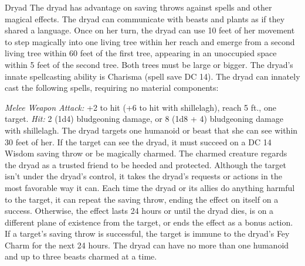 \documentclass[10pt,a4paper,twoside,twocolumn,openany,bg=print,nodeprecatedcode]{dndbook}
\begin{document}
\begin{DndMonster}[float*=t]{Dryad}
\DndMonsterBasics[
armor-class = {11 (16 with barkskin)},
hit-points = {\DndDice{5d8}},
speed = {30 ft.}
]
\DndMonsterAbilityScores[
 str = 10,
 dex = 12,
 con = 11,
 int = 14,
 wis = 15,
 cha = 18
]
\DndMonsterDetails[
skills = {Perception +4, Stealth +5},
senses = {darkvision 60 ft., passive perception 14},
languages = {Elvish, Sylvan},
challenge = 1,
]
The dryad has advantage on saving throws against spells and other magical effects.
The dryad can communicate with beasts and plants as if they shared a language.
Once on her turn, the dryad can use 10 feet of her movement to step magically into one living tree within her reach and emerge from a second living tree within 60 feet of the first tree, appearing in an unoccupied space within 5 feet of the second tree. Both trees must be large or bigger.
The dryad's innate spellcasting ability is Charisma (spell save DC 14). The dryad can innately cast the following spells, requiring no material components:
\begin{DndMonsterSpells}
\end{DndMonsterSpells}
\par
{}
\textsl{Melee Weapon Attack:} +2 to hit (+6 to hit with shillelagh), reach 5 ft., one target. \textsl{Hit:} 2 (1d4) bludgeoning damage, or 8 (1d8 + 4) bludgeoning damage with shillelagh.
The dryad targets one humanoid or beast that she can see within 30 feet of her. If the target can see the dryad, it must succeed on a DC 14 Wisdom saving throw or be magically charmed. The charmed creature regards the dryad as a trusted friend to be heeded and protected. Although the target isn't under the dryad's control, it takes the dryad's requests or actions in the most favorable way it can.
Each time the dryad or its allies do anything harmful to the target, it can repeat the saving throw, ending the effect on itself on a success. Otherwise, the effect lasts 24 hours or until the dryad dies, is on a different plane of existence from the target, or ends the effect as a bonus action. If a target's saving throw is successful, the target is immune to the dryad's Fey Charm for the next 24 hours.
The dryad can have no more than one humanoid and up to three beasts charmed at a time.
\end{DndMonster}
\end{document}

